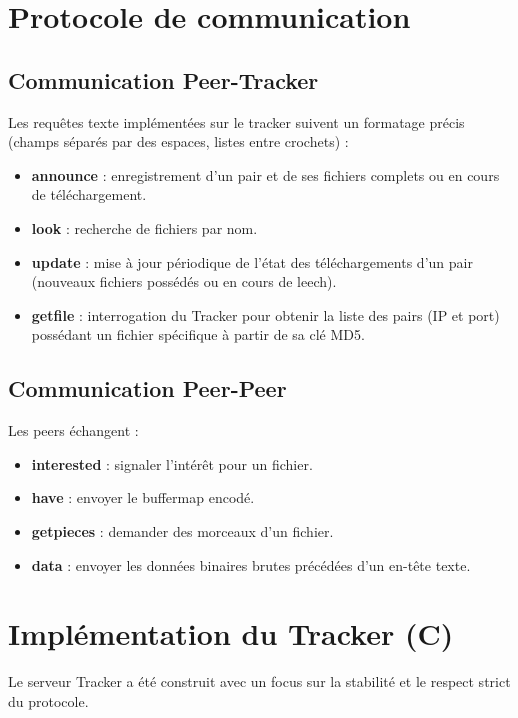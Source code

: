 \documentclass[11pt, a4paper]{article}
\begin{document}
\section{Protocole de communication}
\subsection{Communication Peer-Tracker}
Les requêtes texte implémentées sur le tracker suivent un formatage précis (champs séparés par des espaces, listes entre crochets) :
\begin{itemize}
    \item \textbf{announce} : enregistrement d'un pair et de ses fichiers complets ou en cours de téléchargement.
    \item \textbf{look} : recherche de fichiers par nom.
    \item \textbf{update} : mise à jour périodique de l'état des téléchargements d'un pair (nouveaux fichiers possédés ou en cours de leech).
    \item \textbf{getfile} : interrogation du Tracker pour obtenir la liste des pairs (IP et port) possédant un fichier spécifique à partir de sa clé MD5.
\end{itemize}

\subsection{Communication Peer-Peer}
Les peers échangent :
\begin{itemize}
    \item \textbf{interested} : signaler l’intérêt pour un fichier.
    \item \textbf{have} : envoyer le buffermap encodé.
    \item \textbf{getpieces} : demander des morceaux d'un fichier.
    \item \textbf{data} : envoyer les données binaires brutes précédées d'un en-tête texte.
\end{itemize}

\section{Implémentation du Tracker (C)}
Le serveur Tracker a été construit avec un focus sur la stabilité et le respect strict du protocole.
\end{document}
